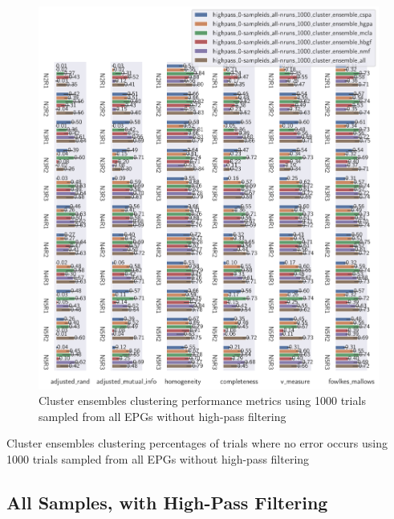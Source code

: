 \begin{theappendices}
\begin{figure}[htbp]
\centering
\includegraphics[width=\textwidth]{./figures/clust_comparison/highpass_0-sampleids_all-nruns_1000_cluster_ensembles.pdf}
\caption{Cluster ensembles clustering performance metrics using 1000 trials sampled from all EPGs without high-pass filtering}
\label{appendix:fig:highpass_0-sampleids_all-nruns_1000_cluster_ensembles}
\end{figure}

\begin{table}[htbp]
\centering
{}
\caption{Cluster ensembles clustering percentages of trials where no error occurs using 1000 trials sampled from all EPGs without high-pass filtering}
\label{appendix:table:highpass_0-sampleids_all-nruns_1000_cluster_ensembles}
\end{table}

\FloatBarrier
\subsection{All Samples, with High-Pass Filtering}


\end{theappendices}
